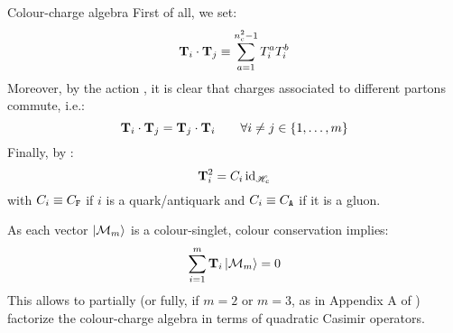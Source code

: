 \begin{observation}{Colour-charge algebra}{}
  First of all, we set:
  \begin{equation}
    \mathbf{T}_i \cdot \mathbf{T}_j \equiv \sum_{a = 1}^{n_c^2 - 1} T_i^a T_i^b
    \label{eq:t-dot}
  \end{equation}
  Moreover, by the action , it is clear that charges associated to different partons commute, i.e.:
  \begin{equation}
    \mathbf{T}_i \cdot \mathbf{T}_j = \mathbf{T}_j \cdot \mathbf{T}_i
    \qquad
    \forall i \neq j \in \{1, \dots, m\}
  \end{equation}
  Finally, by :
  \begin{equation}
    \mathbf{T}_i^2 = C_i \operatorname{id}_{\mathscr{H}_c}
  \end{equation}
  with $ C_i \equiv C_\mathtt{F} $ if $ i $ is a quark/antiquark and $ C_i \equiv C_\mathtt{A} $ if it is a gluon.
\end{observation}

As each vector $ \ket{\mathcal{M}_m} $ is a colour-singlet, colour conservation implies:
\begin{equation}
  \sum_{i = 1}^{m} \mathbf{T}_i \ket{\mathcal{M}_m} = 0
\end{equation}
This allows to partially (or fully, if $ m = 2 $ or $ m = 3 $, as in Appendix A of \cite{Catani-1997}) factorize the colour-charge algebra in terms of quadratic Casimir operators.










